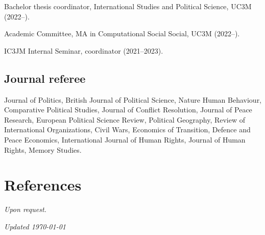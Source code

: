 \documentclass[a4paper, 12pt]{article}
\begin{document}
\noindent
Bachelor thesis coordinator, International Studies and Political Science, UC3M (2022--).

\noindent
Academic Committee, MA in Computational Social Social, UC3M (2022--).

\noindent
IC3JM Internal Seminar, coordinator (2021--2023).

\subsection*{Journal referee}

Journal of Politics, British Journal of Political Science, Nature Human Behaviour, Comparative Political Studies, Journal of Conflict Resolution, Journal of Peace Research, European Political Science Review, Political Geography, Review of International Organizations, Civil Wars, Economics of Transition, Defence and Peace Economics, International Journal of Human Rights, Journal of Human Rights, Memory Studies.


\section*{References}

\textit{Upon request.}

%
%
%

\vfill

\noindent
\flushright
{\small\it Updated \monthdate\today}
\end{document}
